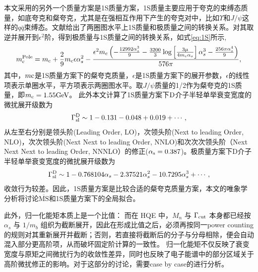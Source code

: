         本文采用的另外一个质量方案是1S质量方案，1S质量主要应用于夸克的束缚态质量，如底夸克和粲夸克，尤其是在强相互作用下产生的夸克对中，比如$\Upsilon$和$J/\psi$这样的$q\bar{q}$束缚态。文献给出了两圈图水平上1S质量和极质量之间的转换关系。对其取逆并展开到$\epsilon^2$阶，得到极质量与1S质量之间的转换关系，如式\eqref{eq:1S}所示,
        \begin{equation}
            m_{\mathrm{c}}^{\text{Pole}}=m_{\mathrm{c}}+\frac{2}{9} m_{\mathrm{c}}\epsilon \alpha_s^2-\frac{\epsilon^2 m_{\mathrm{c}}\left(-\frac{12992 \alpha_s^3}{9}-\frac{3200}{3} \log \left[\frac{3 \mu}{4 m_{\mathrm{c}} \alpha_s}\right] \alpha_s^3-\frac{256 \pi \alpha_s^4}{9}\right)}{576\pi},
            \label{eq:1S}
        \end{equation}
        其中，$m\mathrm{c}$是1S质量方案下的粲夸克质量，$\epsilon$是1S质量方案下的展开参数，$\epsilon$的线性项表示单圈水平，平方项表示两圈图水平。取$J/\psi$质量的1/2作为粲夸克的1S质量，即$m_{\mathrm{c}}=1.55\mathrm{GeV}$。
        此外本文计算了1S质量方案下$\mathrm{D}$介子半轻单举衰变宽度的微扰展开级数为
        \begin{equation}
            \Gamma_{\mathrm{sl}}^{\mathrm{D}}\sim 1-0.131-0.048+0.019+\cdots,
        \end{equation}
        从左至右分别是领头阶(Leading Order, LO)，次领头阶(Next to leading Order, NLO)，次次领头阶(Next Next to leading Order, NNLO)和次次次领头阶（Next Next Next to leading Order, NNNLO）的修正($\mathrm{\alpha_s=0.387}$)。极质量方案下D介子半轻单举衰变宽度的微扰展开级数为
        $$\Gamma_{\mathrm{sl}}^{\mathrm{D}}\sim1-0.768104 \alpha_s-2.37521 \alpha_s^2-10.7295 \alpha_s^3+\cdots,$$
        收敛行为较差。因此，1S质量方案是比较合适的粲夸克质量方案，本文的唯象学分析将讨论$\overline{\text{MS}}$和1S质量方案下的全局拟合。
        
        此外，归一化能矩本质上是一个比值：
而在 HQE 中，\(M_n\) 与 \(\Gamma_{\rm cut}\) 本身都已经按 \(\alpha_s\) 与 \(1/m_b\) 组织为截断展开，因此在形成比值之后，必须再按同一power counting的规则对其重新展开并截断；否则，若直接将截断后的分子与分母相除，便会自动混入部分更高阶项，从而破坏固定阶计算的一致性。 
归一化能矩不仅反映了衰变宽度与原矩之间微扰行为的收敛性差异，同时也反映了电子能谱中的部分区域关于高阶微扰修正的影响。对于这部分的讨论，需要case by case的进行分析。


